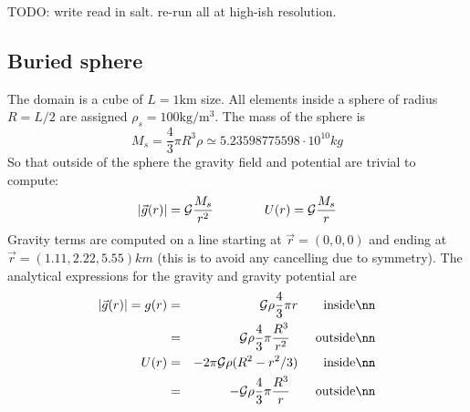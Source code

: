 TODO: write read in salt. re-run all at high-ish resolution.



\newpage
\subsection*{Buried sphere}

The domain is a cube of $L=1\si{\km}$ size. All elements inside a sphere of radius $R=L/2$ are assigned
$\rho_s=100\si{\kg\per\cubic\metre}$.
The mass of the sphere is 
\[
M_s = \frac{4}{3}\pi R^3 \rho \simeq 5.23598775598 \cdot 10^{10} \si{kg}
\]
So that outside of the sphere the gravity field and potential are trivial to compute:
\[
|\vec{g}(r)|={\cal G}\frac{M_s}{r^2}
\qquad
\qquad
U(r)={\cal G}\frac{M_s}{r}
\]
Gravity terms are computed on a line starting at $\vec{r}=(0,0,0)$ and ending at $\vec{r}=(1.11,2.22,5.55)\si{km}$ (this is to avoid any cancelling due to symmetry).
The analytical expressions for the gravity and gravity potential are 
\begin{eqnarray}
|\vec{g}(r)|=g(r) 
&=& {\cal G} \rho \frac{4}{3}\pi r \qquad \text{inside} \nn\\
&=& {\cal G} \rho \frac{4}{3}\pi \frac{R^3}{r^2}  \qquad \text{outside} \nn\\
U(r) 
&=& - 2 \pi {\cal G} \rho (R^2-r^2/3) \qquad \text{inside} \nn\\
&=& - {\cal G} \rho \frac{4}{3}\pi \frac{R^3}{r}  \qquad \text{outside} \nn
\end{eqnarray}

